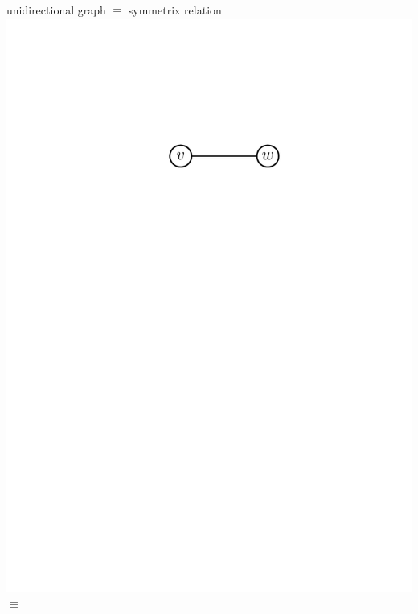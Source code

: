 unidirectional graph $\equiv$ symmetrix relation \\
\includegraphics[scale=.5]{01_graph_theory/pics/graph_edge.pdf} $\equiv$ 

